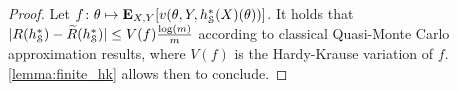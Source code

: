   \begin{proof}
    Let $f \colon \theta \mapsto
    \mathbf{{E}}_{X,Y}[
    v(\theta,Y, h^{*}_{\mathcal{S}}(X)(\theta))]$. It holds that
    $|R(h^{*}_{\mathcal{S}}) - \widetilde{R}(h^{*}_{\mathcal{S}})|
      \leq V(f) \frac{\log(m)}{m}$
    according to classical Quasi-Monte Carlo approximation results, where $V(f)$
    is the Hardy-Krause variation of $f$. \cref{lemma:finite_hk} allows then to conclude.


\end{proof}
